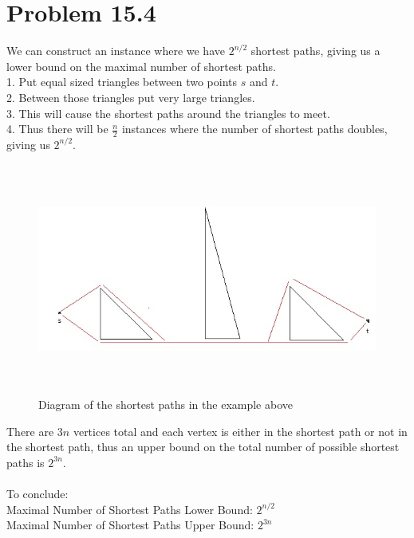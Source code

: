 \documentclass[11pt,psfig]{article}
\begin{document}
\newpage

\section*{Problem 15.4}

We can construct an instance where we have $2^{n/2}$ shortest paths, giving us a lower bound on the maximal number of shortest paths. \\
1. Put equal sized triangles between two points $s$ and $t$. \\
2. Between those triangles put very large triangles. \\
3. This will cause the shortest paths around the triangles to meet. \\
4. Thus there will be $\frac{n}{2}$ instances where the number of shortest paths doubles, giving us $2^{n/2}$. 

\begin{figure}[H]
\centering
\includegraphics[height=3in]{shortestPaths_diagram.jpg}
\caption{Diagram of the shortest paths in the example above}
\end{figure}

There are $3n$ vertices total and each vertex is either in the shortest path or not in the shortest path, thus an upper bound on the total number of possible shortest paths is $2^{3n}$. \\
\\
To conclude:\\
Maximal Number of Shortest Paths Lower Bound: $2^{n/2}$\\
Maximal Number of Shortest Paths Upper Bound: $2^{3n}$ \\
\end{document}
